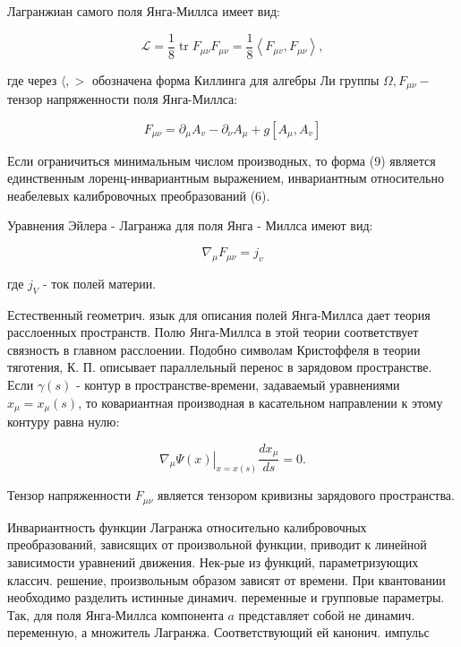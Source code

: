 \documentclass[10pt]{article}
\begin{document}
Лагранжиан самого поля Янга-Миллса имеет вид:



\[

\mathscr{L}=\frac{1}{8} \operatorname{tr} F_{\mu \nu} F_{\mu \nu}=\frac{1}{8}\left\langle F_{\mu v}, F_{\mu \nu}\right\rangle,

\]



где через $\langle,>$ обозначена форма Киллинга для алгебры Ли группы $\Omega, F_{\mu \nu}-$ тензор напряженности поля Янга-Миллса:



\[

F_{\mu \nu}=\partial_{\mu} A_{v}-\partial_{\nu} A_{\mu}+g\left[A_{\mu}, A_{v}\right]

\]



Если ограничиться минимальным числом производных, то форма (9) является единственным лоренц-инвариантным выражением, инвариантным относительно неабелевых калибровочных преобразований (6).



Уравнения Эйлера - Лагранжа для поля Янга - Миллса имеют вид:



\[

\nabla_{\mu} F_{\mu \nu}=j_{v}

\]



где $j_{V}$ - ток полей материи.



Естественный геометрич. язык для описания полей Янга-Миллса дает теория расслоенных пространств. Полю Янга-Миллса в этой теории соответствует связность в главном расслоении. Подобно символам Кристоффеля в теории тяготения, К. П. описывает параллельный перенос в зарядовом пространстве. Если $\gamma(s)$ - контур в пространстве-времени, задаваемый уравнениями $x_{\mu}=x_{\mu}(s)$, то ковариантная производная в касательном направлении к этому контуру равна нулю:



\[

\left.\nabla_{\mu} \Psi(x)\right|_{x=x(s)} \frac{d x_{\mu}}{d s}=0 .

\]



Тензор напряженности $F_{\mu \nu}$ является тензором кривизны зарядового пространства.



Инвариантность функции Лагранжа относительно калибровочных преобразований, зависящих от произвольной функции, приводит к линейной зависимости уравнений движения. Нек-рые из функций, параметризующих классич. решение, произвольным образом зависят от времени. При квантовании необходимо разделить истинные динамич. переменные и групповые параметры. Так, для поля Янга-Миллса компонента $a$ представляет собой не динамич. переменную, а множитель Лагранжа. Соответствующий ей канонич. импульс
\end{document}
